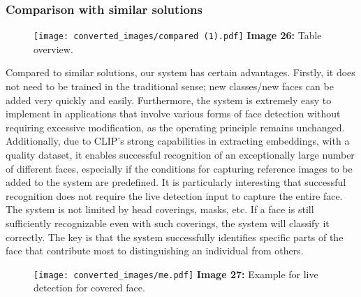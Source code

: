 \documentclass{article}
\begin{document}
\subsubsection*{Comparison with similar solutions}
\begin{figure}[H]
    \centering
    \texttt{[image: converted\_images/compared (1).pdf]}
    \textbf{Image 26:} Table overview.
\end{figure}
\hspace*{1.00cm}Compared to similar solutions,\cite{thinkingneuron2020facerecognition} our system has certain advantages. Firstly, it does not need to be trained in the traditional sense; new classes/new faces can be added very quickly and easily. Furthermore, the system is extremely easy to implement in applications that involve various forms of face detection without requiring excessive modification, as the operating principle remains unchanged. Additionally, due to CLIP's strong capabilities in extracting embeddings, with a quality dataset, it enables successful recognition of an exceptionally large number of different faces, especially if the conditions for capturing reference images to be added to the system are predefined. It is particularly interesting that successful recognition does not require the live detection input to capture the entire face. The system is not limited by head coverings, masks, etc. If a face is still sufficiently recognizable even with such coverings, the system will classify it correctly. The key is that the system successfully identifies specific parts of the face that contribute most to distinguishing an individual from others.
\begin{figure}[H]
    \centering
    \texttt{[image: converted\_images/me.pdf]}
    \textbf{Image 27:} Example for live detection for covered face.
\end{figure}
\end{document}
